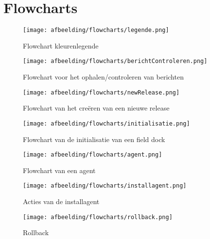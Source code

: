 \chapter{Flowcharts}\label{sec:flowcharts}
\begin{figure}[!ht]
\centering
\texttt{[image: afbeelding/flowcharts/legende.png]}
\caption{Flowchart kleurenlegende}
\label{fig:flow:legende}
\end{figure}

\begin{figure}[!ht]
\centering
\texttt{[image: afbeelding/flowcharts/berichtControleren.png]}
\caption{Flowchart voor het ophalen/controleren van berichten}
\label{fig:flow:bericht}
\end{figure}

\begin{figure}[!ht]
\centering
\texttt{[image: afbeelding/flowcharts/newRelease.png]}
\caption{Flowchart van het creëren van een nieuwe release}
\label{fig:flow:release}
\end{figure}

\begin{figure}[!ht]
\centering
\texttt{[image: afbeelding/flowcharts/initialisatie.png]}
\caption{Flowchart van de initialisatie van een field dock}
\label{fig:flow:init}
\end{figure}

\begin{figure}[!ht]
\centering
\texttt{[image: afbeelding/flowcharts/agent.png]}
\caption{Flowchart van een agent}
\label{fig:flow:agent}
\end{figure}

\begin{figure}[!ht]
\centering
\texttt{[image: afbeelding/flowcharts/installagent.png]}
\caption{Acties van de installagent}
\label{fig:flow:install}
\end{figure}

\begin{figure}[!ht]
\centering
\texttt{[image: afbeelding/flowcharts/rollback.png]}
\caption{Rollback}
\label{fig:flow:rollback}
\end{figure}
